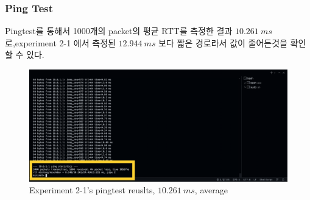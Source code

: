 \subsubsection*{Ping Test}
Pingtest를 통해서 1000개의 packet의 평균 RTT를 측정한 결과 $10.261\ ms$로,experiment 2-1 에서 측정된 $12.944\ ms$ 보다 짧은 경로라서 값이 줄어든것을 확인할 수 있다.\\
\vspace{-4mm}
\begin{figure}[!h]\centering 
	\includegraphics[width=.99\textwidth]{image/week08/2-2-2.png}
	\caption{\footnotesize
	 Experiment 2-1’s pingtest reuslts, $10.261\ ms$, average}
	\vspace{-10pt}
\end{figure}
\clearpage